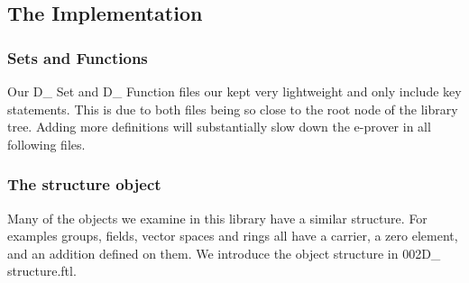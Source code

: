 \documentclass[11pt]{article}
\begin{document}
\begin{figure}[h]
\begin{center}
\end{center}
\end{figure}

\subsection{The Implementation}

\subsubsection{Sets and Functions}

Our D\_ Set and D\_ Function files our kept very lightweight and only include key statements. This is due to both files being so close to the root node of the library tree. Adding more definitions will substantially slow down the e-prover in all following files.

\subsubsection{The structure object}
Many of the objects we examine in this library have a similar structure. For examples groups, fields, vector spaces and rings all have a carrier, a zero element, and an addition defined on them. We introduce the object structure in 002D\_ structure.ftl. 
\end{document}
